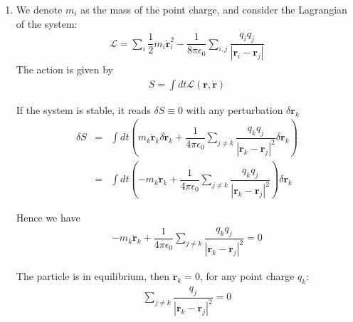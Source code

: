 \documentclass[a4paper,11pt]{article}
\begin{document}
\begin{enumerate}
\begin{enumerate}
        \item We denote $m_i$ as the mass of the point charge, and consider the Lagrangian of the system:
        \begin{eqnarray}
            \mathcal{L}=\sum\limits_{i}\dfrac{1}{2}m_i\dot{\boldsymbol{r}}_i^2-\dfrac{1}{8\pi\epsilon_0}\sum\limits_{i,j}\dfrac{q_iq_j}{|\boldsymbol{r}_i-\boldsymbol{r}_j|}
        \end{eqnarray}
        The action is given by
        \begin{eqnarray}
            S = \int dt \mathcal{L}(\boldsymbol{r},\dot{\boldsymbol{r}})
        \end{eqnarray}

        If the system is stable, it reads $\delta S\equiv 0$ with any perturbation $\delta\boldsymbol{r}_k$
        \begin{eqnarray}
            \delta S 
            &=& \int dt\left(m_k\dot{\boldsymbol{r}}_k\delta \dot{\boldsymbol{r}}_k+\dfrac{1}{4\pi\epsilon_0}\sum\limits_{j\neq k}\dfrac{q_kq_j}{|\boldsymbol{r}_k-\boldsymbol{r}_j|^2}\delta \boldsymbol{r}_k\right)\nonumber \\
            &=& \int dt\left(-m_k\ddot{\boldsymbol{r}}_k+\dfrac{1}{4\pi\epsilon_0}\sum\limits_{j\neq k}\dfrac{q_kq_j}{|\boldsymbol{r}_k-\boldsymbol{r}_j|^2}\right)\delta \boldsymbol{r}_k
        \end{eqnarray}

        Hence we have 
        \begin{eqnarray}
            -m_k\ddot{\boldsymbol{r}}_k+\dfrac{1}{4\pi\epsilon_0}\sum\limits_{j\neq k}\dfrac{q_kq_j}{|\boldsymbol{r}_k-\boldsymbol{r}_j|^2}=0
        \end{eqnarray}

        The particle is in equilibrium, then $\ddot{\boldsymbol{r}}_k=0$, for any point charge $q_k$:
        \begin{eqnarray}\label{eq3}
            \sum\limits_{j\neq k}\dfrac{q_j}{|\boldsymbol{r}_k-\boldsymbol{r}_j|^2}=0
        \end{eqnarray}


\end{enumerate}
\end{enumerate}
\end{document}
